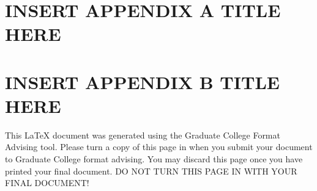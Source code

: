 \documentclass[oneside,11pt]{memoir}
\begin{document}
\vspace*{1in}
\begin{SingleSpace}
	

\end{SingleSpace}


\appendix
{}
\chapter{\uppercase{Insert Appendix A Title here}}
\clearpage
\chapter{\uppercase{Insert Appendix B Title here}}
\clearpage


This LaTeX document was generated using the Graduate College Format Advising tool. Please turn a copy of this page in when you submit your document to Graduate College format advising. You may discard this page once you have printed your final document. DO NOT TURN THIS PAGE IN WITH YOUR FINAL DOCUMENT!
\end{document}
